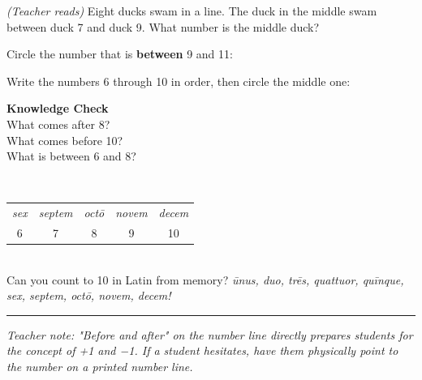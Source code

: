 \documentclass[12pt,letterpaper]{article}
\begin{document}
\vspace{8pt}
\prob \textit{(Teacher reads)} Eight ducks swam in a line.
The duck in the middle swam between duck 7 and duck 9.
What number is the middle duck? \quad\ansblank

\vspace{8pt}
\prob Circle the number that is \textbf{between} 9 and 11:\\[6pt]
\hspace{2cm}{\Large 8 \quad 10 \quad 12}

\vspace{8pt}
\prob Write the numbers 6 through 10 in order, then circle the middle one:\\[6pt]
\hspace{1cm}\ansblank\quad\ansblank\quad\ansblank\quad\ansblank\quad\ansblank

\goldrule

\begin{checkbox}
\noindent\textbf{\color{sd-green}Knowledge Check}\\[4pt]
\setcounter{probnum}{0}
\prob What comes after 8? \quad\ansblank\\[8pt]
\prob What comes before 10? \quad\ansblank\\[8pt]
\prob What is between 6 and 8? \quad\ansblank
\end{checkbox}

\vfill
{}\\[4pt]
\begin{tabular}{ccccc}
\textit{sex} & \textit{septem} & \textit{octō} & \textit{novem} & \textit{decem}\\
6 & 7 & 8 & 9 & 10
\end{tabular}\\[4pt]
Can you count to 10 in Latin from memory?
\textit{ūnus, duo, trēs, quattuor, quīnque, sex, septem, octō, novem, decem!}

\vspace{4pt}\hrule\vspace{3pt}
{\footnotesize\color{gray}\textit{Teacher note: "Before and after" on the number line directly prepares students
  for the concept of +1 and −1. If a student hesitates, have them physically
  point to the number on a printed number line.}}
\end{document}
